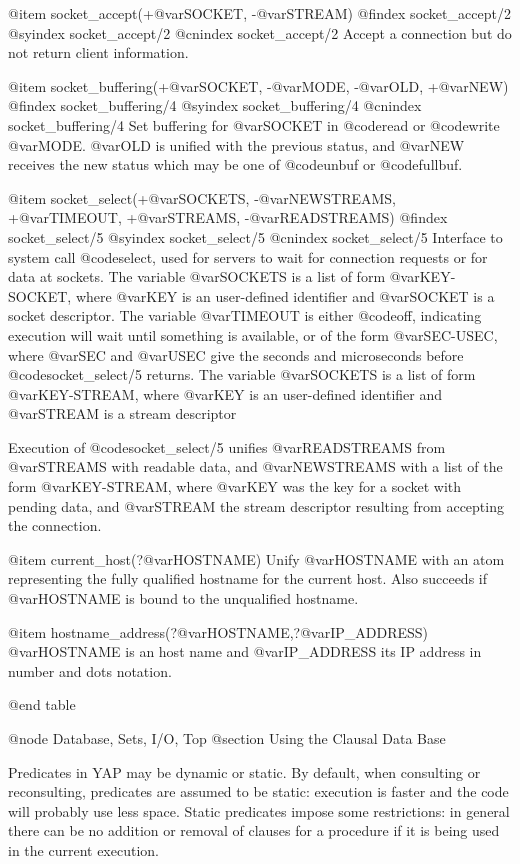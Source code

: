 {{{{{{@item socket_accept(+@var{SOCKET}, -@var{STREAM})
@findex socket_accept/2
@syindex socket_accept/2
@cnindex socket_accept/2
Accept a connection but do not return client information.

@item socket_buffering(+@var{SOCKET}, -@var{MODE}, -@var{OLD}, +@var{NEW})
@findex socket_buffering/4
@syindex socket_buffering/4
@cnindex socket_buffering/4
Set buffering for @var{SOCKET} in @code{read} or @code{write}
@var{MODE}. @var{OLD} is unified with the previous status, and @var{NEW}
receives the new status which may be one of @code{unbuf} or
@code{fullbuf}.

@item socket_select(+@var{SOCKETS}, -@var{NEWSTREAMS}, +@var{TIMEOUT}, +@var{STREAMS}, -@var{READSTREAMS})
@findex socket_select/5
@syindex socket_select/5
@cnindex socket_select/5
Interface to system call @code{select}, used for servers to wait for
connection requests or for data at sockets. The variable
@var{SOCKETS} is a list of form @var{KEY-SOCKET}, where @var{KEY} is
an user-defined identifier and @var{SOCKET} is a socket descriptor. The
variable @var{TIMEOUT} is either @code{off}, indicating execution will
wait until something is available, or of the form @var{SEC-USEC}, where
@var{SEC} and @var{USEC} give the seconds and microseconds before
@code{socket_select/5} returns. The variable @var{SOCKETS} is a list of
form @var{KEY-STREAM}, where @var{KEY} is an user-defined identifier
and @var{STREAM} is a stream descriptor

Execution of @code{socket_select/5} unifies @var{READSTREAMS} from
@var{STREAMS} with readable data, and @var{NEWSTREAMS} with a list of
the form @var{KEY-STREAM}, where @var{KEY} was the key for a socket
with pending data, and @var{STREAM} the stream descriptor resulting
from accepting the connection.  

@item current_host(?@var{HOSTNAME})
Unify @var{HOSTNAME} with an atom representing the fully qualified
hostname for the current host. Also succeeds if @var{HOSTNAME} is bound
to the unqualified hostname.

@item hostname_address(?@var{HOSTNAME},?@var{IP_ADDRESS})
@var{HOSTNAME} is an host name and @var{IP_ADDRESS} its IP
address in number and dots notation.


@end table

@node Database, Sets, I/O, Top
@section Using the Clausal Data Base

Predicates in YAP may be dynamic or static. By default, when
consulting or reconsulting, predicates are assumed to be static:
execution is faster and the code will probably use less space.
Static predicates impose some restrictions: in general there can be no 
addition or removal of  clauses for a procedure if it is being used in the
current execution.

}}}}}}
